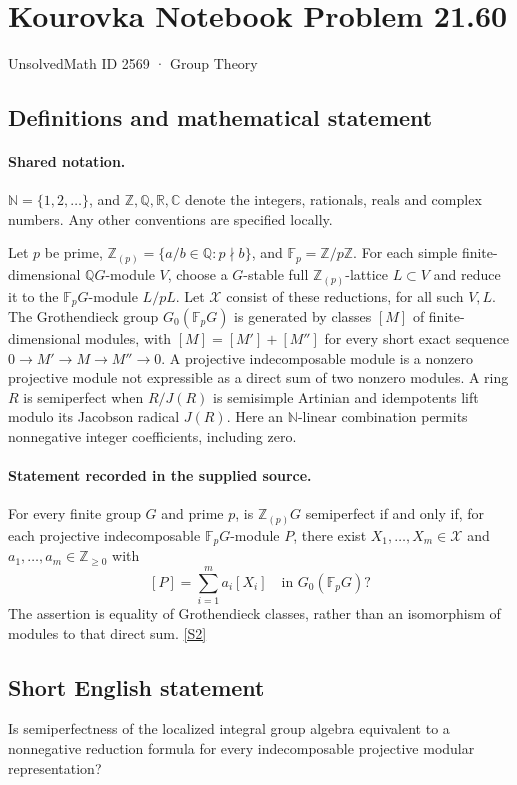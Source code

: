 \documentclass[11pt]{article}
\newcommand{\sref}[2]{\hyperlink{source:#1:#2}{[S#2]}}
\begin{document}
\setcounter{section}{2568}
\section{Kourovka Notebook Problem 21.60}\label{2569}
{\small\sffamily UnsolvedMath ID 2569 · Group Theory}
\subsection{Definitions and mathematical statement}

\paragraph{Shared notation.}$\mathbb N=\{1,2,\ldots\}$, and $\mathbb Z,\mathbb Q,\mathbb R,\mathbb C$ denote the integers, rationals, reals and complex numbers. Any other conventions are specified locally.


Let $p$ be prime, $\mathbb Z_{(p)}=\{a/b\in\mathbb Q:p\nmid b\}$, and $\mathbb F_p=\mathbb Z/p\mathbb Z$. For each simple finite-dimensional $\mathbb QG$-module $V$, choose a $G$-stable full $\mathbb Z_{(p)}$-lattice $L\subset V$ and reduce it to the $\mathbb F_pG$-module $L/pL$. Let $\mathcal X$ consist of these reductions, for all such $V,L$. The Grothendieck group $G_0(\mathbb F_pG)$ is generated by classes $[M]$ of finite-dimensional modules, with $[M]=[M']+[M'']$ for every short exact sequence $0\to M'\to M\to M''\to0$. A projective indecomposable module is a nonzero projective module not expressible as a direct sum of two nonzero modules. A ring $R$ is semiperfect when $R/J(R)$ is semisimple Artinian and idempotents lift modulo its Jacobson radical $J(R)$. Here an $\mathbb N$-linear combination permits nonnegative integer coefficients, including zero.
\paragraph{Statement recorded in the supplied source.}
For every finite group $G$ and prime $p$, is $\mathbb Z_{(p)}G$ semiperfect if and only if, for each projective indecomposable $\mathbb F_pG$-module $P$, there exist $X_1,\ldots,X_m\in\mathcal X$ and $a_1,\ldots,a_m\in\mathbb Z_{\geq0}$ with
\[
 [P]=\sum_{i=1}^{m}a_i[X_i]\quad\text{in }G_0(\mathbb F_pG)?
\]
The assertion is equality of Grothendieck classes, rather than an isomorphism of modules to that direct sum. \sref{2569}{2}
\subsection{Short English statement}
Is semiperfectness of the localized integral group algebra equivalent to a nonnegative reduction formula for every indecomposable projective modular representation?
\end{document}
